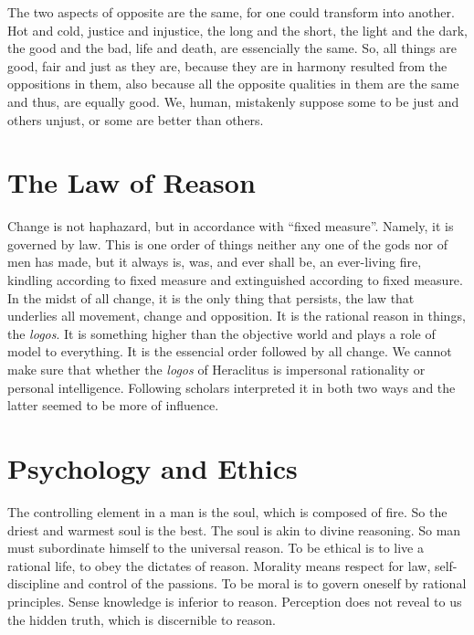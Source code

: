 \documentclass[11pt]{article}
\begin{document}
\newline

The two aspects of opposite are the same, for one could transform into another. 
Hot and cold, justice and injustice, the long and the short, the light and the dark, the good and the bad, life and death, are essencially the same. 
So, all things are good, fair and just as they are, because they are in harmony resulted from the oppositions in them, also because all the opposite qualities in them are the same and thus, are equally good. 
We, human, mistakenly suppose some to be just and others unjust, or some are better than others. 

\section{The Law of Reason}
Change is not haphazard, but in accordance with “fixed measure”. 
Namely, it is governed by law. 
This is one order of things neither any one of the gods nor of men has made, but it always is, was, and ever shall be, an ever-living fire, kindling according to fixed measure and extinguished according to fixed measure. 
In the midst of all change, it is the only thing that persists, the law that underlies all movement, change and opposition. 
It is the rational reason in things, the \textit{logos}. 
It is something higher than the objective world and plays a role of model to everything. 
It is the essencial order followed by all change. 
We cannot make sure that whether the \textit{logos} of Heraclitus is impersonal rationality or personal intelligence. 
Following scholars interpreted it in both two ways and the latter seemed to be more of influence. 

\section{Psychology and Ethics}
The controlling element in a man is the soul, which is composed of fire. 
So the driest and warmest soul is the best. 
The soul is akin to divine reasoning. 
So man must subordinate himself to the universal reason. 
To be ethical is to live a rational life, to obey the dictates of reason. 
Morality means respect for law, self-discipline and control of the passions. 
To be moral is to govern oneself by rational principles. 
Sense knowledge is inferior to reason. 
Perception does not reveal to us the hidden truth, which is discernible to reason.
\end{document}
